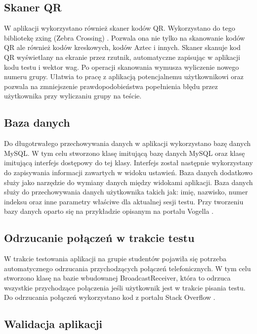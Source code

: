 \documentclass[archivemod, eng]{mgr}
\begin{document}
			\subsection{Skaner QR}
			
			W aplikacji wykorzystano również skaner kodów QR. Wykorzystano do tego bibliotekę zxing (Zebra Crossing) \cite{zxing}. Pozwala ona nie tylko na skanowanie kodów QR ale również kodów kreskowych, kodów Aztec i innych. Skaner skanuje kod QR wyświetlany na ekranie przez rzutnik, automatyczne zapisując w aplikacji kodu testu i wektor wag. Po operacji skanowania wymusza wyliczenie nowego numeru grupy. Ułatwia to pracę z aplikacją potencjalnemu użytkownikowi oraz pozwala na zmniejszenie prawdopodobieństwa popełnienia błędu przez użytkownika przy wyliczaniu grupy na teście.
			
			\subsection{Baza danych}
			
			Do długotrwałego przechowywania danych w aplikacji wykorzystano bazę danych MySQL. W tym celu stworzono klasę imitującą bazę danych MySQL oraz klasę imitującą interfejs dostępowy do tej klasy. Interfejs został następnie wykorzystany do zapisywania informacji zawartych w widoku ustawień. Baza danych dodatkowo służy jako narzędzie do wymiany danych między widokami aplikacji. Baza danych służy do przechowywania danych użytkownika takich jak: imię, nazwisko, numer indeksu oraz inne parametry właściwe dla aktualnej sesji testu. Przy tworzeniu bazy danych oparto się na przykładzie opisanym na portalu Vogella \cite{sqlitedatabase}.
			
			\subsection{Odrzucanie połączeń w trakcie testu}
			
			W trakcie testowania aplikacji na grupie studentów pojawiła się potrzeba automatycznego odrzucania przychodzących połączeń telefonicznych. W tym celu stworzono klasę na bazie wbudowanej BroadcastReceiver, która to odrzuca wszystkie przychodzące połączenia jeśli użytkownik jest w trakcie pisania testu. Do odrzucania połączeń wykorzystano kod z portalu Stack Overflow \cite{callreject}.
			
			\subsection{Walidacja aplikacji}
			
\end{document}
